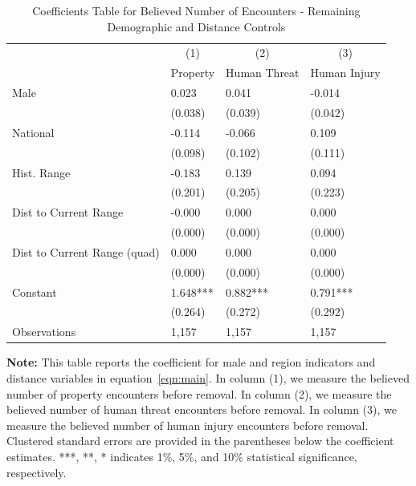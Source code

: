 \documentclass[english,12pt]{article}
\begin{document}
\begin{table}[H]
    \centering
    \caption{Coefficients Table for Believed Number of Encounters - Remaining Demographic and Distance Controls}
    \footnotesize
    \begin{tabular}{@{}llll@{}}
        \toprule
                           &\multicolumn{1}{c}{(1)}   &\multicolumn{1}{c}{(2)}   &\multicolumn{1}{c}{(3)}  \\
                           & Property & Human Threat & Human Injury \\ \midrule
        Male        &       0.023   &       0.041   &      -0.014   \\
                    &     (0.038)   &     (0.039)   &     (0.042)   \\
        National    &      -0.114   &      -0.066   &       0.109   \\
                    &     (0.098)   &     (0.102)   &     (0.111)   \\
        Hist. Range &      -0.183   &       0.139   &       0.094   \\
                    &     (0.201)   &     (0.205)   &     (0.223)   \\
        Dist to Current Range&      -0.000   &       0.000   &       0.000   \\
                    &     (0.000)   &     (0.000)   &     (0.000)   \\
        Dist to Current Range (quad)&       0.000   &       0.000   &       0.000   \\
                    &     (0.000)   &     (0.000)   &     (0.000)   \\\midrule                       
        Constant    &       1.648***&       0.882***&       0.791***\\
                    &     (0.264)   &     (0.272)   &     (0.292)   \\
        Observations & 1,157    &  1,157       & 1,157        \\\bottomrule
    \end{tabular}
    \begin{minipage}{.9\textwidth}
        \vspace{1em}
    \footnotesize{{\bf{Note:}} This table reports the coefficient for male and region indicators and distance variables in equation~\ref{eqn:main}. In column (1), we measure the believed number of property encounters before removal. In column (2), we measure the believed number of human threat encounters before removal. In column (3), we measure the believed number of human injury encounters before removal. Clustered standard errors are provided in the parentheses below the coefficient estimates. ***, **, * indicates 1\%, 5\%, and 10\% statistical significance, respectively.}
    \label{tab: bel_gen}
    \end{minipage}
\end{table}
\end{document}

